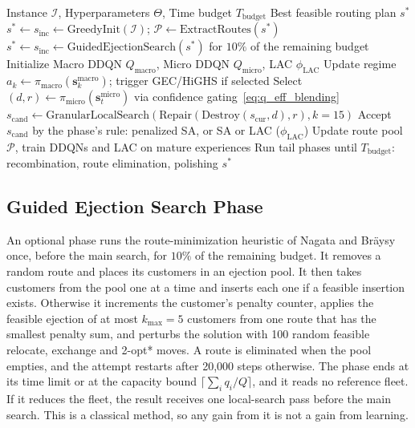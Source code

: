 \documentclass{ieeeaccess}
\begin{document}
\begin{algorithm}[!t]
\caption{Tri-Level Hybrid DDQN-ALNS Overview}
\label{alg:hybrid_ddqn_alns}
\footnotesize
\begin{algorithmic}[1]
\Require Instance $\mathcal{I}$, Hyperparameters $\Theta$, Time budget $T_{\text{budget}}$
\Ensure Best feasible routing plan $s^*$
\State $s^* \leftarrow s_{\text{inc}} \leftarrow \text{GreedyInit}(\mathcal{I})$; $\mathcal{P} \leftarrow \text{ExtractRoutes}(s^*)$
\State $s^* \leftarrow s_{\text{inc}} \leftarrow \text{GuidedEjectionSearch}(s^*)$ for $10\%$ of the remaining budget 
\State Initialize Macro DDQN $Q_{\text{macro}}$, Micro DDQN $Q_{\text{micro}}$, LAC $\phi_{\text{LAC}}$
     
        \State Update regime $a_k \leftarrow \pi_{\text{macro}}(\mathbf{s}_k^{\text{macro}})$; trigger GEC/HiGHS if selected
    \EndIf
    \State Select $(d, r) \leftarrow \pi_{\text{micro}}(\mathbf{s}_t^{\text{micro}})$ via confidence gating~\eqref{eq:q_eff_blending}
    \State $s_{\text{cand}} \leftarrow \text{GranularLocalSearch}(\text{Repair}(\text{Destroy}(s_{\text{cur}}, d), r), k=15)$
    \State Accept $s_{\text{cand}}$ by the phase's rule: penalized SA, or SA or LAC ($\phi_{\text{LAC}}$)
    \State Update route pool $\mathcal{P}$, train DDQNs and LAC on mature experiences
\EndFor
\State Run tail phases until $T_{\text{budget}}$: recombination, route elimination, polishing
\State \Return $s^*$ 
\end{algorithmic}
\end{algorithm}

\subsection{Guided Ejection Search Phase}
\label{sec:ges}
An optional phase runs the route-minimization heuristic of Nagata and Br{\"a}ysy~\cite{nagata2009ges} once, before the main search, for $10\%$ of the remaining budget. It removes a random route and places its customers in an ejection pool. It then takes customers from the pool one at a time and inserts each one if a feasible insertion exists. Otherwise it increments the customer's penalty counter, applies the feasible ejection of at most $k_{\max}=5$ customers from one route that has the smallest penalty sum, and perturbs the solution with 100 random feasible relocate, exchange and 2-opt* moves. A route is eliminated when the pool empties, and the attempt restarts after 20,000 steps otherwise. The phase ends at its time limit or at the capacity bound $\lceil \sum_i q_i / Q \rceil$, and it reads no reference fleet. If it reduces the fleet, the result receives one local-search pass before the main search. This is a classical method, so any gain from it is not a gain from learning.
\end{document}
